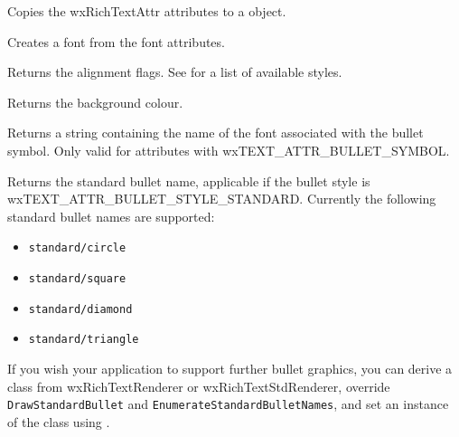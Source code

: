 
Copies the wxRichTextAttr attributes to a  object.

\label{wxrichtextattrcreatefont}


Creates a font from the font attributes.

\label{wxrichtextattrgetalignment}


Returns the alignment flags.
See  for a list of available styles.

\label{wxrichtextattrgetbackgroundcolour}


Returns the background colour.

\label{wxrichtextattrgetbulletfont}


Returns a string containing the name of the font associated with the bullet symbol.
Only valid for attributes with wxTEXT\_ATTR\_BULLET\_SYMBOL.

\label{wxrichtextattrgetbulletname}


Returns the standard bullet name, applicable if the bullet style is wxTEXT\_ATTR\_BULLET\_STYLE\_STANDARD.
Currently the following standard bullet names are supported:

\begin{itemize}\itemsep=0pt
\item {\tt standard/circle}
\item {\tt standard/square}
\item {\tt standard/diamond}
\item {\tt standard/triangle}
\end{itemize}

If you wish your application to support further bullet graphics, you can derive a
class from wxRichTextRenderer or wxRichTextStdRenderer, override {\tt DrawStandardBullet} and {\tt EnumerateStandardBulletNames}, and
set an instance of the class using .

